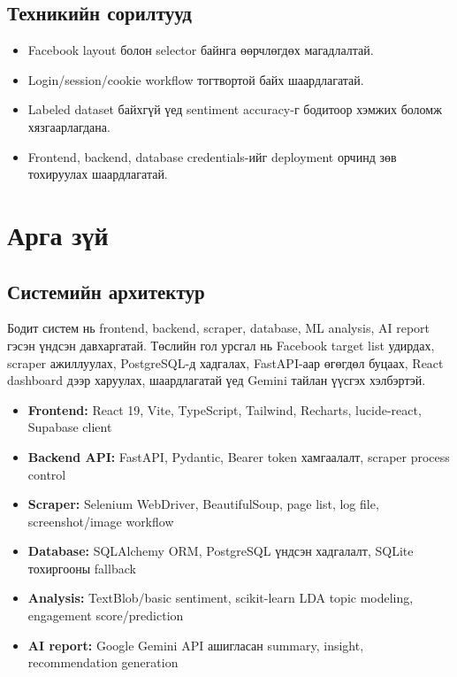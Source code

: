 \documentclass[
12pt,
oneside,
english,
onehalfspacing,
nolistspacing,
headsepline,
]{MUST-Thesis}
\begin{document}
\section{Техникийн сорилтууд}

\begin{itemize}
    \item Facebook layout болон selector байнга өөрчлөгдөх магадлалтай.
    \item Login/session/cookie workflow тогтвортой байх шаардлагатай.
    \item Labeled dataset байхгүй үед sentiment accuracy-г бодитоор хэмжих боломж хязгаарлагдана.
    \item Frontend, backend, database credentials-ийг deployment орчинд зөв тохируулах шаардлагатай.
\end{itemize}

\chapter{Арга зүй}

\section{Системийн архитектур}

Бодит систем нь frontend, backend, scraper, database, ML analysis, AI report гэсэн үндсэн давхаргатай. Төслийн гол урсгал нь Facebook target list удирдах, scraper ажиллуулах, PostgreSQL-д хадгалах, FastAPI-аар өгөгдөл буцаах, React dashboard дээр харуулах, шаардлагатай үед Gemini тайлан үүсгэх хэлбэртэй.

\begin{itemize}
    \item \textbf{Frontend:} React 19, Vite, TypeScript, Tailwind, Recharts, lucide-react, Supabase client
    \item \textbf{Backend API:} FastAPI, Pydantic, Bearer token хамгаалалт, scraper process control
    \item \textbf{Scraper:} Selenium WebDriver, BeautifulSoup, page list, log file, screenshot/image workflow
    \item \textbf{Database:} SQLAlchemy ORM, PostgreSQL үндсэн хадгалалт, SQLite тохиргооны fallback
    \item \textbf{Analysis:} TextBlob/basic sentiment, scikit-learn LDA topic modeling, engagement score/prediction
    \item \textbf{AI report:} Google Gemini API ашигласан summary, insight, recommendation generation
\end{itemize}
\end{document}
